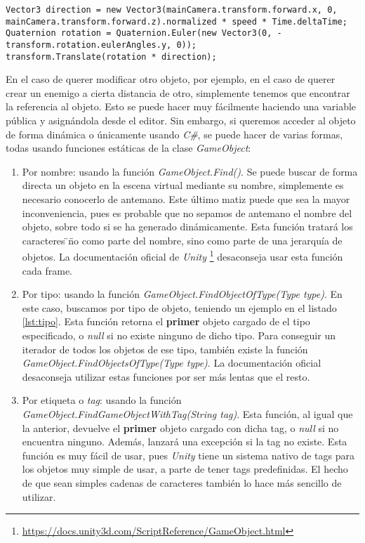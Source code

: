 \documentclass{pre-tfg}
\begin{document}
\begin{spacing}{1}
\begin{lstlisting}[float=htbp, caption={Acceso al componente transform para modificar el propio objeto}, label=lst:local]
Vector3 direction = new Vector3(mainCamera.transform.forward.x, 0, mainCamera.transform.forward.z).normalized * speed * Time.deltaTime;
Quaternion rotation = Quaternion.Euler(new Vector3(0, -transform.rotation.eulerAngles.y, 0));
transform.Translate(rotation * direction);
\end{lstlisting}

En el caso de querer modificar otro objeto, por ejemplo, en el caso de querer crear un enemigo a cierta distancia de otro, simplemente tenemos que encontrar la referencia al objeto. Esto se puede hacer muy fácilmente haciendo una variable pública y asignándola desde el editor. Sin embargo, si queremos acceder al objeto de forma dinámica o únicamente usando \textit{C\#}, se puede hacer de varias formas, todas usando funciones estáticas de la clase \textit{GameObject}:

\begin{enumerate}
\item Por nombre: usando la función \textit{GameObject.Find()}. Se puede buscar de forma directa un objeto en la escena virtual mediante su nombre, simplemente es necesario conocerlo de antemano. Este último matiz puede que sea la mayor inconveniencia, pues es probable que no sepamos de antemano el nombre del objeto, sobre todo si se ha generado dinámicamente. Esta función tratará los caracteres \"\/\" no como parte del nombre, sino como parte de una jerarquía de objetos. La documentación oficial de \textit{Unity} \footnote{\url{https://docs.unity3d.com/ScriptReference/GameObject.html}} desaconseja usar esta función cada frame.
\item Por tipo: usando la función \textit{GameObject.FindObjectOfType(Type type)}. En este caso, buscamos por tipo de objeto, teniendo un ejemplo en el listado \ref{lst:tipo}.
 Esta función retorna el \textbf{primer} objeto cargado de el tipo especificado, o \textit{null} si no existe ninguno de dicho tipo. Para conseguir un iterador de todos los objetos de ese tipo, también existe la función \textit{GameObject.FindObjectsOfType(Type type)}. La documentación oficial desaconseja utilizar estas funciones por ser más lentas que el resto.
\item Por etiqueta o \textit{tag}: usando la función \textit{GameObject.FindGameObjectWithTag(String tag)}. Esta función, al igual que la anterior, devuelve el \textbf{primer} objeto cargado con dicha tag, o \textit{null} si no encuentra ninguno. Además, lanzará una excepción si la tag no existe. Esta función es muy fácil de usar, pues \textit{Unity} tiene un sistema nativo de tags para los objetos muy simple de usar, a parte de tener tags predefinidas. El hecho de que sean simples cadenas de caracteres también lo hace más sencillo de utilizar. 
\end{enumerate}


\end{spacing}
\end{document}
